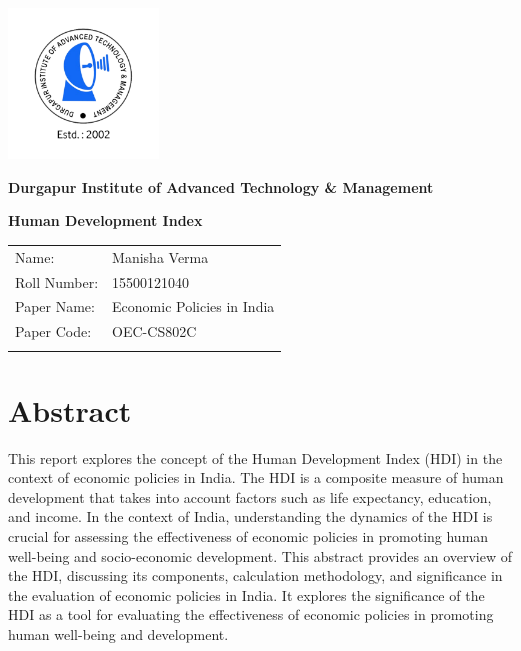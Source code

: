 \documentclass[12pt]{report}
\begin{document}
\begin{titlepage}
    \centering
    \includegraphics[width=4cm]{transparent logo.png}

    \Large \textbf{Durgapur Institute of Advanced Technology \& Management}
    \vspace{6cm}

    \Large \textbf{Human Development Index}\par
    \vspace{1cm}
    
    \large
    \begin{tabular}{l l}
        Name: & Manisha Verma \\
        Roll Number: & 15500121040 \\
        Paper Name: & Economic Policies in India \\
        Paper Code: & OEC-CS802C \\ \\
    \end{tabular}
\end{titlepage}

\tableofcontents

\newpage
\section*{Abstract}
This report explores the concept of the Human Development Index (HDI) in the context of economic policies in India. The HDI is a composite measure of human development that takes into account factors such as life expectancy, education, and income. In the context of India, understanding the dynamics of the HDI is crucial for assessing the effectiveness of economic policies in promoting human well-being and socio-economic development. This abstract provides an overview of the HDI, discussing its components, calculation methodology, and significance in the evaluation of economic policies in India. It explores the significance of the HDI as a tool for evaluating the effectiveness of economic policies in promoting human well-being and development.
\end{document}
